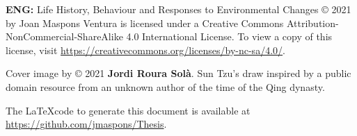 \documentclass[12pt,a4paper,twoside,fleqn]{memoir}
\begin{document}
\medskip


\textbf{ENG:} Life History, Behaviour and Responses to Environmental Changes
© 2021 by Joan Maspons Ventura is licensed under a Creative Commons
Attribution-NonCommercial-ShareAlike 4.0 International License. To view a copy
of this license, visit \url{https://creativecommons.org/licenses/by-nc-sa/4.0/}.

Cover image by © 2021 \textbf{Jordi Roura Solà}. Sun Tzu's draw inspired by a
public domain resource from an unknown author of the time of the Qing dynasty.

\bigskip

The \LaTeX code to generate this document is available at
\url{https://github.com/jmaspons/Thesis}.


\cleardoublepage %



\tableofcontents* %

\clearpage


\listoffigures %



\listoftables %



\end{document}
